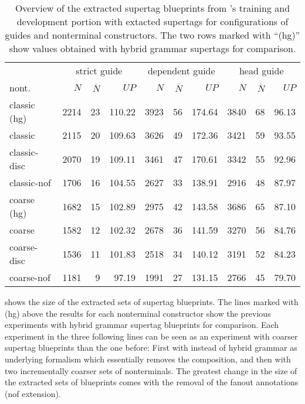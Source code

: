 \documentclass[../../document.tex]{subfiles}
\begin{document}
    \begin{table}
        \caption{\label{tbl:gridsearch:dcp:1}
            Overview of the extracted  supertag blueprints from \negra{}'s training and development portion with extacted  supertags for configurations of guides and nonterminal constructors. The two rows marked with ``(hg)'' show values obtained with hybrid grammar supertags for comparison.
        }
        \centering
        \vspace{.2cm}
        \begin{tabular}{l|rrr|rrr|rrr}
            \toprule
                & \multicolumn{3}{c|}{strict guide} &  \multicolumn{3}{c|}{dependent guide} &  \multicolumn{3}{c}{head guide} \\
nont.           & $N$ & $\overline{N}$ & $\mathit{UP}$ & $N$ & $\overline{N}$ & $\mathit{UP}$ & $N$ & $\overline{N}$ & $\mathit{UP}$ \\ \hline
\rowcolor{black!10}
classic (hg) & 2214 & 23 & 110.22 & 3923 & 56 & 174.64 & 3840 & 68 & 96.13 \\\hline
classic      & 2115 & 20 & 109.63 & 3626 & 49 & 172.36 & 3421 & 59 & 93.55 \\
classic-disc & 2070 & 19 & 109.11 & 3461 & 47 & 170.61 & 3342 & 55 & 92.96 \\
classic-nof  & 1706 & 16 & 104.55 & 2627 & 33 & 138.91 & 2916 & 48 & 87.97 \\  \hline
\rowcolor{black!10}
coarse (hg)  & 1682 & 15 & 102.89 & 2975 & 42 & 143.58 & 3686 & 65 & 87.10 \\\hline
coarse       & 1582 & 12 & 102.32 & 2678 & 36 & 141.59 & 3270 & 56 & 84.76 \\
coarse-disc  & 1536 & 11 & 101.83 & 2518 & 34 & 140.12 & 3191 & 52 & 84.23 \\
coarse-nof   & 1181 & 9  & 97.19  & 1991 & 27 & 131.15 & 2766 & 45 & 79.70 \\
\bottomrule
        \end{tabular}
    \end{table}

     shows the size of the extracted sets of supertag blueprints.
    The lines marked with (hg) above the results for each nonterminal constructor show the previous experiments with hybrid grammar supertag blueprints for comparison.
    Each experiment in the three following lines can be seen as an experiment with coarser supertag blueprints than the one before:
        First with  instead of hybrid grammar as underlying formalism which essentially removes the  composition, and then with two incrementally coarser sets of nonterminals.
    The greatest change in the size of the extracted sets of blueprints comes with the removal of the fanout annotations (nof extension).
\end{document}
